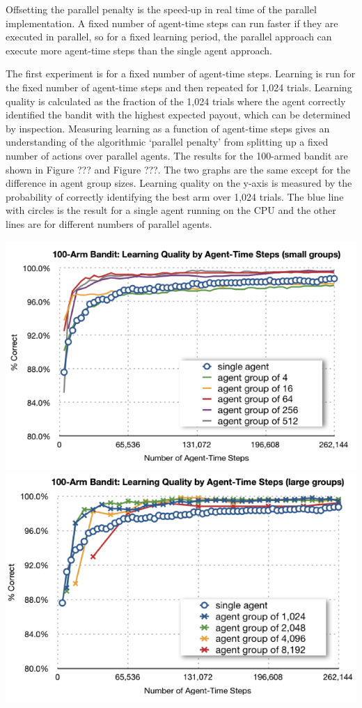 \documentclass[11pt]{article} %
\begin{document}
\begin{flushleft}
Offsetting the parallel penalty is the speed-up in real time of the parallel implementation.  A fixed number of agent-time steps can run faster if they are executed in parallel, so for a fixed learning period, the parallel approach can execute more agent-time steps than the single agent approach.

The first experiment is for a fixed number of agent-time steps.  Learning is run for the fixed number of agent-time steps and then repeated for 1,024 trials.  Learning quality is calculated as the fraction of the 1,024 trials where the agent correctly identified the bandit with the highest expected payout, which can be determined by inspection.  Measuring learning as a function of agent-time steps gives an understanding of the algorithmic ‘parallel penalty’ from splitting up a fixed number of actions over parallel agents. The results for the 100-armed bandit are shown in Figure ??? and Figure ???.  The two graphs are the same except for the difference in agent group sizes.  Learning quality on the y-axis is measured by the probability of correctly identifying the best arm over 1,024 trials.  The blue line with circles is the result for a single agent running on the CPU and the other lines are for different numbers of parallel agents.

\end{flushleft}
\center
\includegraphics[scale=0.8]{fig02}
\includegraphics[scale=0.8]{fig03}
\end{document}
